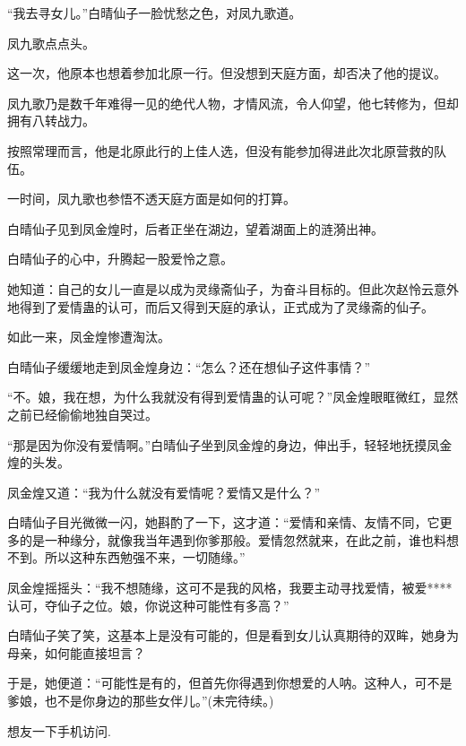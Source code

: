 \begin{this_body}
“我去寻女儿。”白晴仙子一脸忧愁之色，对凤九歌道。

凤九歌点点头。

这一次，他原本也想着参加北原一行。但没想到天庭方面，却否决了他的提议。

凤九歌乃是数千年难得一见的绝代人物，才情风流，令人仰望，他七转修为，但却拥有八转战力。

按照常理而言，他是北原此行的上佳人选，但没有能参加得进此次北原营救的队伍。

一时间，凤九歌也参悟不透天庭方面是如何的打算。

白晴仙子见到凤金煌时，后者正坐在湖边，望着湖面上的涟漪出神。

白晴仙子的心中，升腾起一股爱怜之意。

她知道：自己的女儿一直是以成为灵缘斋仙子，为奋斗目标的。但此次赵怜云意外地得到了爱情蛊的认可，而后又得到天庭的承认，正式成为了灵缘斋的仙子。

如此一来，凤金煌惨遭淘汰。

白晴仙子缓缓地走到凤金煌身边：“怎么？还在想仙子这件事情？”

“不。娘，我在想，为什么我就没有得到爱情蛊的认可呢？”凤金煌眼眶微红，显然之前已经偷偷地独自哭过。

“那是因为你没有爱情啊。”白晴仙子坐到凤金煌的身边，伸出手，轻轻地抚摸凤金煌的头发。

凤金煌又道：“我为什么就没有爱情呢？爱情又是什么？”

白晴仙子目光微微一闪，她斟酌了一下，这才道：“爱情和亲情、友情不同，它更多的是一种缘分，就像我当年遇到你爹那般。爱情忽然就来，在此之前，谁也料想不到。所以这种东西勉强不来，一切随缘。”

凤金煌摇摇头：“我不想随缘，这可不是我的风格，我要主动寻找爱情，被爱****认可，夺仙子之位。娘，你说这种可能性有多高？”

白晴仙子笑了笑，这基本上是没有可能的，但是看到女儿认真期待的双眸，她身为母亲，如何能直接坦言？

于是，她便道：“可能性是有的，但首先你得遇到你想爱的人呐。这种人，可不是爹娘，也不是你身边的那些女伴儿。”(未完待续。)

想友一下手机访问.

\end{this_body}

